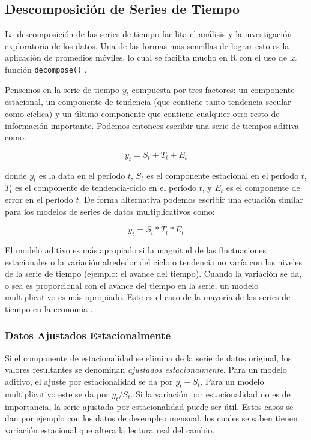 \begin{spacing}{1.5}
\subsection{Descomposición de Series de Tiempo}
La descomposición de las series de tiempo facilita el análisis y la investigación exploratoria de los datos. Una de las formas mas sencillas de lograr esto es la aplicación de promedios móviles, lo cual se facilita mucho en R con el uso de la función \texttt{decompose()} \cite{daroczi}.

Pensemos en la serie de tiempo $y_t$ compuesta por tres factores: un componente estacional, un componente de tendencia (que contiene tanto tendencia secular como cíclica) y un último componente que contiene cualquier otro resto de información importante. Podemos entonces escribir una serie de tiempos aditiva como:

\[ y_t = S_t + T_t + E_t \]

donde $y_t$ es la data en el período $t$, $S_t$ es el componente estacional en el período $t$, $T_t$ es el componente de tendencia-ciclo en el período $t$, y $E_t$ es el componente de error en el período $t$. De forma alternativa podemos escribir una ecuación similar para los modelos de series de datos multiplicativos como:

\[ y_t = S_t * T_t * E_t  \]

El modelo aditivo es más apropiado si la magnitud de las fluctuaciones estacionales o la variación alrededor del ciclo o tendencia no varía con los niveles de la serie de tiempo (ejemplo: el avance del tiempo). Cuando la variación se da, o sea es proporcional con el avance del tiempo en la serie, un modelo multiplicativo es más apropiado. Este es el caso de la mayoría de las series de tiempo en la economía \cite{hyndman}.

\subsubsection{Datos Ajustados Estacionalmente}
Si el componente de estacionalidad se elimina de la serie de datos original, los valores resultantes se denominan \emph{ajustados estacionalmente}. Para un modelo aditivo, el ajuste por estacionalidad se da por $y_t - S_t$. Para un modelo multiplicativo este se da por $y_t/S_t$. Si la variación por estacionalidad no es de importancia, la serie ajustada por estacionalidad puede ser útil. Estos casos se dan por ejemplo con los datos de desempleo mensual, los cuales se saben tienen variación estacional que altera la lectura real del cambio. 


\end{spacing}
